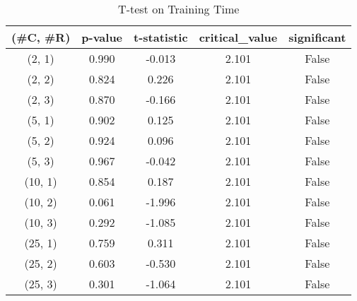 \begin{table}
\centering
\caption{T-test on Training Time}
\label{tab:t-testTraining}
\begin{tabular}{|c|c|c|c|c|}
\toprule
(\#C, \#R) &  p-value &  t-statistic &  critical\_value &  significant \\
\midrule
  (2, 1) &    0.990 &       -0.013 &           2.101 &        False \\
  (2, 2) &    0.824 &        0.226 &           2.101 &        False \\
  (2, 3) &    0.870 &       -0.166 &           2.101 &        False \\
  (5, 1) &    0.902 &        0.125 &           2.101 &        False \\
  (5, 2) &    0.924 &        0.096 &           2.101 &        False \\
  (5, 3) &    0.967 &       -0.042 &           2.101 &        False \\
 (10, 1) &    0.854 &        0.187 &           2.101 &        False \\
 (10, 2) &    0.061 &       -1.996 &           2.101 &        False \\
 (10, 3) &    0.292 &       -1.085 &           2.101 &        False \\
 (25, 1) &    0.759 &        0.311 &           2.101 &        False \\
 (25, 2) &    0.603 &       -0.530 &           2.101 &        False \\
 (25, 3) &    0.301 &       -1.064 &           2.101 &        False \\
\bottomrule
\end{tabular}
\end{table}
